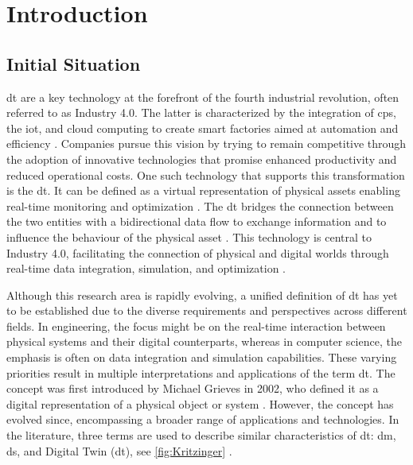 \chapter{Introduction}
\label{chap:introduction}

\section{Initial Situation}
\gls{dt} are a key technology at the forefront of the fourth industrial revolution, often referred to as Industry 4.0.
The latter is characterized by the integration of \gls{cps}, the \gls{iot}, and cloud computing to create smart factories aimed at automation and efficiency \autocite{Oztemel2020}. Companies pursue this vision by trying to remain competitive through the adoption of innovative technologies that promise enhanced productivity and reduced operational costs. One such technology that supports this transformation is the \gls{dt}. It can be defined as a virtual representation of physical assets enabling real-time monitoring and optimization \autocite{Tao2018ijamt}. The \gls{dt} bridges the connection between the two entities with a bidirectional data flow to exchange information and to influence the behaviour of the physical asset \autocite{grieves2014digital}. This technology is central to Industry 4.0, facilitating the connection of physical and digital worlds through real-time data integration, simulation, and optimization \autocite{judijanto2024trends}.

Although this research area is rapidly evolving, a unified definition of \gls{dt} has yet to be established due to the diverse requirements and perspectives across different fields. In engineering, the focus might be on the real-time interaction between physical systems and their digital counterparts, whereas in computer science, the emphasis is often on data integration and simulation capabilities. These varying priorities result in multiple interpretations and applications of the term \gls{dt}. The concept was first introduced by Michael Grieves in 2002, who defined it as a digital representation of a physical object or system \autocite{grieves2014digital}. However, the concept has evolved since, encompassing a broader range of applications and technologies. In the literature, three terms are used to describe similar characteristics of \gls{dt}: \gls{dm}, \gls{ds}, and Digital Twin (\gls{dt}), see \autoref{fig:Kritzinger} \autocite{jones2020characterising,Zhang2021jmsy}.

